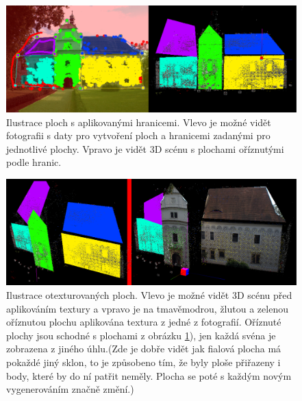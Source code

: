 \documentclass[11pt,twoside,a4paper]{book}
\begin{document}
\clearpage

\begin{figure}[]
	\begin{center}
		\includegraphics[width=15cm]{ilustrace/program/P-4}
		\caption{Ilustrace ploch s aplikovanými hranicemi. Vlevo je možné vidět fotografii s daty pro vytvoření ploch a hranicemi zadanými pro jednotlivé plochy. Vpravo je vidět 3D scénu s plochami oříznutými podle hranic.}
		\label{fig:P-4}
	\end{center}
\end{figure}

\begin{figure}[]
	\begin{center}
		\includegraphics[width=15cm]{ilustrace/program/P-5}
		\caption{Ilustrace otexturovaných ploch. Vlevo je možné vidět 3D scénu před aplikováním textury a vpravo je na tmavěmodrou, žlutou a zelenou oříznutou plochu aplikována textura z jedné z fotografií. Oříznuté plochy jsou schodné s plochami z obrázku \ref{fig:P-4}), jen každá svéna je zobrazena z jiného úhlu.(Zde je dobře vidět jak fialová plocha má pokaždé jiný sklon, to je způsobeno tím, že byly ploše přiřazeny i body, které by do ní patřit neměly. Plocha se poté s každým novým vygenerováním značně změní.)}
		\label{fig:P-5}
	\end{center}
\end{figure}
\end{document}
